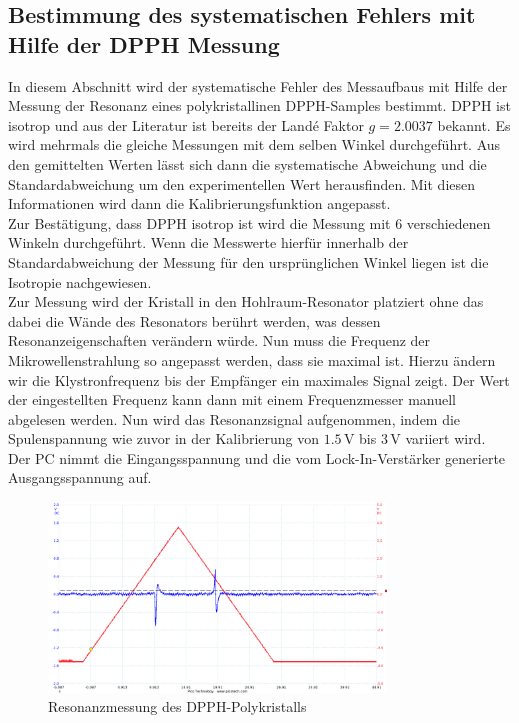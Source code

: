 \documentclass{scrartcl}
\begin{document}
\subsection{Bestimmung des systematischen Fehlers mit Hilfe der DPPH Messung}
In diesem Abschnitt wird der systematische Fehler des Messaufbaus mit Hilfe der Messung der Resonanz eines polykristallinen DPPH-Samples bestimmt. DPPH ist isotrop und aus der Literatur \cite{Anleitung} ist bereits der Landé Faktor $g=2.0037$ bekannt. Es wird mehrmals die gleiche Messungen mit dem selben Winkel durchgeführt. Aus den gemittelten Werten lässt sich dann die systematische Abweichung und die Standardabweichung um den experimentellen Wert herausfinden. Mit diesen Informationen wird dann die Kalibrierungsfunktion angepasst. \\
Zur Bestätigung, dass DPPH isotrop ist wird die Messung mit 6 verschiedenen Winkeln durchgeführt. Wenn die Messwerte hierfür innerhalb der Standardabweichung der Messung für den ursprünglichen Winkel liegen ist die Isotropie nachgewiesen. \\
Zur Messung wird der Kristall in  den Hohlraum-Resonator platziert ohne das dabei die Wände des Resonators berührt werden, was dessen Resonanzeigenschaften verändern würde. Nun muss die Frequenz der Mikrowellenstrahlung so angepasst werden, dass sie maximal ist. Hierzu ändern wir die Klystronfrequenz bis der Empfänger ein maximales Signal zeigt. Der Wert der eingestellten Frequenz kann dann mit einem Frequenzmesser manuell abgelesen werden. Nun wird das Resonanzsignal aufgenommen, indem die Spulenspannung wie zuvor in der Kalibrierung von $1.5 \, \mathrm{V}$ bis $3 \, \mathrm{V}$ variiert wird. Der PC nimmt die Eingangsspannung und die vom Lock-In-Verstärker generierte Ausgangsspannung auf. 
\begin{figure}[h!]
    \centering
    \includegraphics[width=0.8\textwidth]{3_3DHHPWinkel0Frequenz8823M1.png}
    \caption{Resonanzmessung des DPPH-Polykristalls}
    \label{DPPHMessung}
\end{figure}
\end{document}
